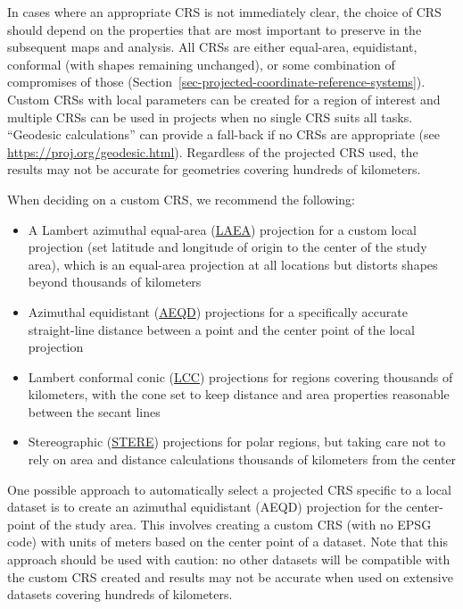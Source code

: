 \documentclass[
  letterpaper,
]{krantz}
\providecommand{\tightlist}{%
  \setlength{\itemsep}{0pt}\setlength{\parskip}{0pt}}\usepackage{longtable,booktabs,array}
\begin{document}
In cases where an appropriate CRS is not immediately clear, the choice
of CRS should depend on the properties that are most important to
preserve in the subsequent maps and analysis. All CRSs are either
equal-area, equidistant, conformal (with shapes remaining unchanged), or
some combination of compromises of those
(Section~\ref{sec-projected-coordinate-reference-systems}). Custom CRSs
with local parameters can be created for a region of interest and
multiple CRSs can be used in projects when no single CRS suits all
tasks. ``Geodesic calculations'' can provide a fall-back if no CRSs are
appropriate (see \url{https://proj.org/geodesic.html}). Regardless of
the projected CRS used, the results may not be accurate for geometries
covering hundreds of kilometers.

When deciding on a custom CRS, we recommend the following:

\begin{itemize}
\tightlist
\item
  A Lambert azimuthal equal-area
  (\href{https://en.wikipedia.org/wiki/Lambert_azimuthal_equal-area_projection}{LAEA})
  projection for a custom local projection (set latitude and longitude
  of origin to the center of the study area), which is an equal-area
  projection at all locations but distorts shapes beyond thousands of
  kilometers
\item
  Azimuthal equidistant
  (\href{https://en.wikipedia.org/wiki/Azimuthal_equidistant_projection}{AEQD})
  projections for a specifically accurate straight-line distance between
  a point and the center point of the local projection
\item
  Lambert conformal conic
  (\href{https://en.wikipedia.org/wiki/Lambert_conformal_conic_projection}{LCC})
  projections for regions covering thousands of kilometers, with the
  cone set to keep distance and area properties reasonable between the
  secant lines
\item
  Stereographic
  (\href{https://en.wikipedia.org/wiki/Stereographic_projection}{STERE})
  projections for polar regions, but taking care not to rely on area and
  distance calculations thousands of kilometers from the center
\end{itemize}

One possible approach to automatically select a projected CRS specific
to a local dataset is to create an azimuthal equidistant (AEQD)
projection for the center-point of the study area. This involves
creating a custom CRS (with no EPSG code) with units of meters based on
the center point of a dataset. Note that this approach should be used
with caution: no other datasets will be compatible with the custom CRS
created and results may not be accurate when used on extensive datasets
covering hundreds of kilometers.
\end{document}
